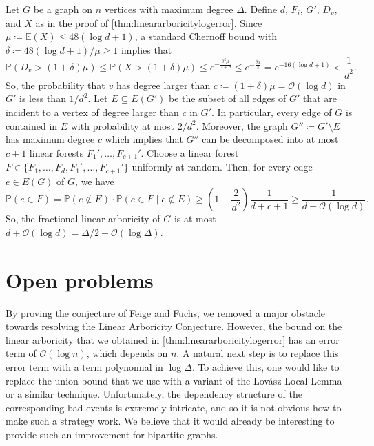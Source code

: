 \documentclass[11pt]{article}
\makeatletter
\theoremstyle{plain}
\theoremstyle{definition}
\renewenvironment{proof}[1][\proofname]
{\par\pushQED{\qed}
	\normalfont\topsep6\p@\@plus6\p@\relax\trivlist
	\item[\hskip\labelsep\bfseries#1\@addpunct{.}]
	\ignorespaces}
{\popQED\endtrivlist\@endpefalse}
\newcommand{\pr}{\mathbb{P}}
\newcommand{\ev}{\mathbb{E}}
\newcommand{\cO}{\mathcal O}
\makeatother
\begin{document}
\begin{proof}[Proof of \cref{thm:fractionallineararboricitylogerror}]
    Let $G$ be a graph on $n$ vertices with maximum degree $\Delta$. Define $d$, $F_i$, $G'$, $D_v$, and $X$ as in the proof of \cref{thm:lineararboricitylogerror}. Since $\mu \coloneqq \ev(X) \le 48 (\log d + 1)$, a standard Chernoff bound with $\delta \coloneqq 48 (\log d + 1) / \mu \ge 1$ implies that
    \[
        \pr(D_v > (1 + \delta) \mu) \le \pr(X > (1 + \delta) \mu) \le e^{-\frac{\delta^2 \mu}{2 + \delta}} \le e^{-\frac{\delta \mu}{3}} = e^{-16 (\log d + 1)} < \frac{1}{d^2}.
    \]
    So, the probability that $v$ has degree larger than $c \coloneqq (1 + \delta) \mu = \cO(\log d)$ in $G'$ is less than $1/d^2$. Let $E \subseteq E(G')$ be the subset of all edges of $G'$ that are incident to a vertex of degree larger than $c$ in $G'$. In particular, every edge of $G$ is contained in $E$ with probability at most $2/d^2$. Moreover, the graph $G'' \coloneqq G' \setminus E$ has maximum degree $c$ which implies that $G''$ can be decomposed into at most $c+1$ linear forests $F_1', \dots, F_{c+1}'$. Choose a linear forest $F \in \{F_1, \dots, F_d, F_1', \dots, F_{c+1}'\}$ uniformly at random. Then, for every edge $e \in E(G)$ of $G$, we have
    \[
        \pr(e \in F) = \pr(e \notin E) \cdot \pr(e \in F \mid e \notin E) \ge \left(1 - \frac{2}{d^2}\right) \frac{1}{d + c + 1} \ge \frac{1}{d + \cO(\log d)}.
    \]
    So, the fractional linear arboricity of $G$ is at most $d + \cO(\log d) = \Delta/2 + \cO(\log \Delta)$.
\end{proof}

\section{Open problems}\label{sec:openproblems}

By proving the conjecture of Feige and Fuchs, we removed a major obstacle towards resolving the Linear Arboricity Conjecture. However, the bound on the linear arboricity that we obtained in \cref{thm:lineararboricitylogerror} has an error term of $\cO(\log n)$, which depends on $n$. A natural next step is to replace this error term with a term polynomial in $\log \Delta$. To achieve this, one would like to replace the union bound that we use with a variant of the Lov\'asz Local Lemma or a similar technique. Unfortunately, the dependency structure of the corresponding bad events is extremely intricate, and so it is not obvious how to make such a strategy work. We believe that it would already be interesting to provide such an improvement for bipartite graphs.
\end{document}
